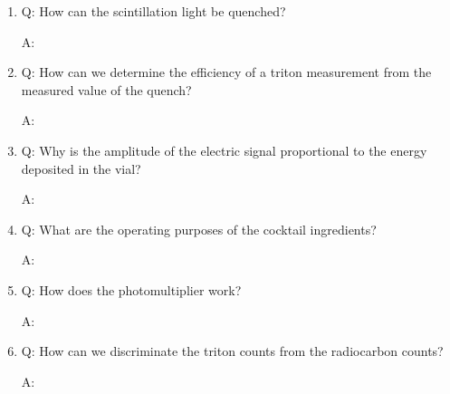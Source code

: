 \begin{enumerate}
    \item Q: How can the scintillation light be quenched?
    \begin{displayquote}
        A: 
    \end{displayquote}
    
    \item Q: How can we determine the efficiency of a triton measurement from the measured
value of the quench?
    \begin{displayquote}
        A: 
    \end{displayquote}
    
    \item Q: Why is the amplitude of the electric signal proportional to the energy deposited in the vial?
    \begin{displayquote}
        A: 
    \end{displayquote}
    
    \item Q: What are the operating purposes of the cocktail ingredients?
    \begin{displayquote}
        A: 
    \end{displayquote}
    
    \item Q: How does the photomultiplier work?
    \begin{displayquote}
        A: 
    \end{displayquote}
    
    \item Q: How can we discriminate the triton counts from the radiocarbon counts?
    \begin{displayquote}
        A: 
    \end{displayquote}
\end{enumerate}